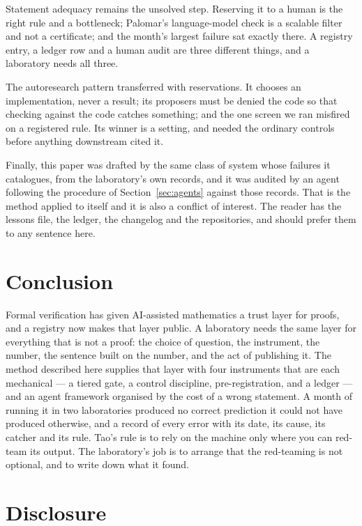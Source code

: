 \documentclass[11pt]{article}
\begin{document}
Statement adequacy remains the unsolved step. Reserving it to a human is the right rule and a
bottleneck; Palomar's language-model check is a scalable filter and not a certificate; and the
month's largest failure sat exactly there. A registry entry, a ledger row and a human audit are
three different things, and a laboratory needs all three.

The autoresearch pattern transferred with reservations. It chooses an implementation, never a
result; its proposers must be denied the code so that checking against the code catches
something; and the one screen we ran misfired on a registered rule. Its winner is a setting,
and needed the ordinary controls before anything downstream cited it.

Finally, this paper was drafted by the same class of system whose failures it catalogues, from
the laboratory's own records, and it was audited by an agent following the procedure of
Section~\ref{sec:agents} against those records. That is the method applied to itself and it is
also a conflict of interest. The reader has the lessons file, the ledger, the changelog and the
repositories, and should prefer them to any sentence here.

\section{Conclusion}
\label{sec:conclusion}

Formal verification has given AI-assisted mathematics a trust layer for proofs, and a registry
now makes that layer public. A laboratory needs the same layer for everything that is not a
proof: the choice of question, the instrument, the number, the sentence built on the number,
and the act of publishing it. The method described here supplies that layer with four
instruments that are each mechanical --- a tiered gate, a control discipline, pre-registration,
and a ledger --- and an agent framework organised by the cost of a wrong statement. A month of
running it in two laboratories produced no correct prediction it could not have produced
otherwise, and a record of every error with its date, its cause, its catcher and its rule. Tao's
rule is to rely on the machine only where you can red-team its output. The laboratory's job is
to arrange that the red-teaming is not optional, and to write down what it found.

\section*{Disclosure}
\end{document}
